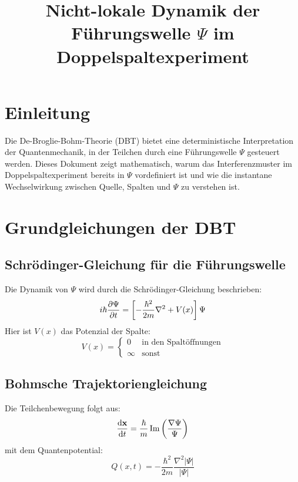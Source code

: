 \documentclass[12pt]{article}
\title{Nicht-lokale Dynamik der Führungswelle $\Psi$ im Doppelspaltexperiment}
\author{}
\date{}
\begin{document}
\maketitle

\section{Einleitung}
Die De-Broglie-Bohm-Theorie (DBT) bietet eine deterministische Interpretation der Quantenmechanik, in der Teilchen durch eine Führungswelle $\Psi$ gesteuert werden. Dieses Dokument zeigt mathematisch, warum das Interferenzmuster im Doppelspaltexperiment bereits in $\Psi$ vordefiniert ist und wie die instantane Wechselwirkung zwischen Quelle, Spalten und $\Psi$ zu verstehen ist.

\section{Grundgleichungen der DBT}

\subsection{Schrödinger-Gleichung für die Führungswelle}
Die Dynamik von $\Psi$ wird durch die Schrödinger-Gleichung beschrieben:
\begin{equation}
i\hbar \pdv{\Psi}{t} = \left[ -\frac{\hbar^2}{2m} \nabla^2 + V(x) \right] \Psi
\end{equation}
Hier ist $V(x)$ das Potenzial der Spalte:
\begin{equation}
V(x) = \begin{cases}
0 & \text{in den Spaltöffnungen} \\
\infty & \text{sonst}
\end{cases}
\end{equation}

\subsection{Bohmsche Trajektoriengleichung}
Die Teilchenbewegung folgt aus:
\begin{equation}
\dv{\vb{x}}{t} = \frac{\hbar}{m} \Im\left( \frac{\nabla \Psi}{\Psi} \right)
\end{equation}
mit dem Quantenpotential:
\begin{equation}
Q(x,t) = -\frac{\hbar^2}{2m} \frac{\nabla^2 |\Psi|}{|\Psi|}
\end{equation}
\end{document}
